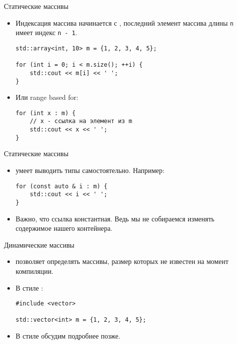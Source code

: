 \documentclass{beamer}
\begin{document}
\begin{frame}[fragile]{Статические массивы}
    \begin{itemize}
        \item Индексация массива начинается с , последний элемент
            массива длины {\tt n} имеет индекс {\tt n - 1}.
            \begin{lstlisting}
std::array<int, 10> m = {1, 2, 3, 4, 5}; 

for (int i = 0; i < m.size(); ++i) {
    std::cout << m[i] << ' '; 
}
            \end{lstlisting}
        \item Или range based for:
            \begin{lstlisting}
for (int x : m) {
    // x - ссылка на элемент из m
    std::cout << x << ' '; 
}
            \end{lstlisting}
    \end{itemize}
\end{frame}

\begin{frame}[fragile]{Статические массивы}
    \begin{itemize}
        \item \langcpp умеет выводить типы самостоятельно. Например:
            \begin{lstlisting}
for (const auto & i : m) {
    std::cout << i << ' '; 
}
            \end{lstlisting}
        \item Важно, что ссылка константная. 
            Ведь мы не собираемся изменять содержимое нашего контейнера. 
    \end{itemize}
\end{frame}

\begin{frame}[fragile]{Динамические массивы}
    \begin{itemize}
        \item \langcpp позволяет определять массивы, 
            размер которых не известен на момент компиляции.
        \item В стиле \langcpp:
            \begin{lstlisting}
#include <vector>

std::vector<int> m = {1, 2, 3, 4, 5}; 
            \end{lstlisting}
        \item В стиле \langc обсудим подробнее позже.
    \end{itemize}
\end{frame}
\end{document}
